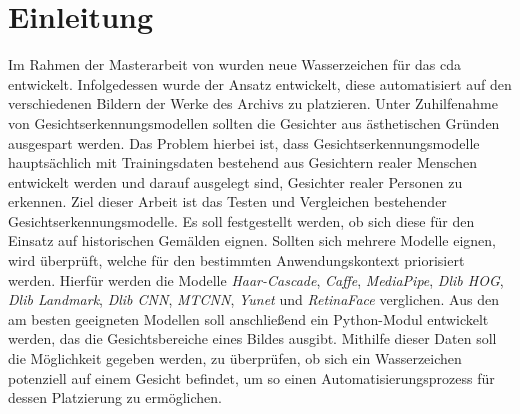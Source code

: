 \chapter{Einleitung}
%
Im Rahmen der Masterarbeit von \cite{pagelsdorf2024} wurden neue Wasserzeichen für das \gls{cda} entwickelt. Infolgedessen wurde der Ansatz entwickelt, diese automatisiert auf den verschiedenen Bildern der Werke des Archivs zu platzieren. Unter Zuhilfenahme von Gesichtserkennungsmodellen sollten die Gesichter aus ästhetischen Gründen ausgespart werden. Das Problem hierbei ist, dass Gesichtserkennungsmodelle hauptsächlich mit Trainingsdaten bestehend aus Gesichtern realer Menschen entwickelt werden und darauf ausgelegt sind, Gesichter realer Personen zu erkennen. Ziel dieser Arbeit ist das Testen und Vergleichen bestehender Gesichtserkennungsmodelle. Es soll festgestellt werden, ob sich diese für den Einsatz auf historischen Gemälden eignen. Sollten sich mehrere Modelle eignen, wird überprüft, welche für den bestimmten Anwendungskontext priorisiert werden. Hierfür werden die Modelle \textit{Haar-Cascade}, \textit{Caffe}, \textit{MediaPipe}, \textit{Dlib HOG}, \textit{Dlib Landmark}, \textit{Dlib CNN}, \textit{MTCNN}, \textit{Yunet} und \textit{RetinaFace} verglichen. Aus den am besten geeigneten Modellen soll anschließend ein Python-Modul entwickelt werden, das die Gesichtsbereiche eines Bildes ausgibt. Mithilfe dieser Daten soll die Möglichkeit gegeben werden, zu überprüfen, ob sich ein Wasserzeichen potenziell auf einem Gesicht befindet, um so einen Automatisierungsprozess für dessen Platzierung zu ermöglichen.

